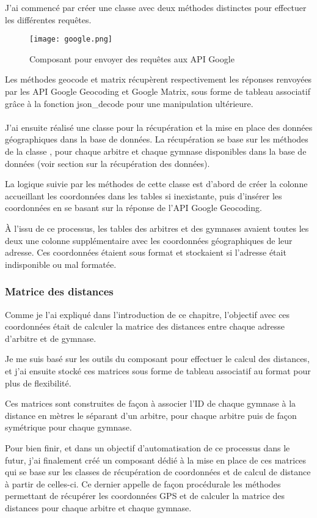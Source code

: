 J’ai commencé par créer une classe avec deux méthodes distinctes pour effectuer les différentes requêtes.

\begin{figure}[!h]
    \centering
    \texttt{[image: google.png]}
    \caption{Composant pour envoyer des requêtes aux API Google}
\end{figure}

Les méthodes geocode et matrix récupèrent respectivement les réponses renvoyées par les API Google Geocoding et Google Matrix, sous forme de tableau associatif grâce à la fonction json\_decode pour une manipulation ultérieure.\\ \\

J’ai ensuite réalisé une classe pour la récupération et la mise en place des données géographiques dans la base de données. La récupération se base sur les méthodes de la classe  , pour chaque arbitre et chaque gymnase disponibles dans la base de données (voir section sur la récupération des données).

La logique suivie par les méthodes de cette classe est d’abord de créer la colonne accueillant les coordonnées dans les tables si inexistante, puis d’insérer les coordonnées en se basant sur la réponse de l’API Google Geocoding.

À l’issu de ce processus, les tables des arbitres et des gymnases avaient toutes les deux une colonne supplémentaire avec les coordonnées géographiques de leur adresse. Ces coordonnées étaient sous format  et stockaient  si l’adresse était indisponible ou mal formatée.

\subsubsection{Matrice des distances}
\vspace{1cm}

Comme je l’ai expliqué dans l’introduction de ce chapitre, l’objectif avec ces coordonnées était de calculer la matrice des distances entre chaque adresse d’arbitre et de gymnase. 

Je me suis basé sur les outils du composant  pour effectuer le calcul des distances, et j’ai ensuite stocké ces matrices sous forme de tableau associatif au format  pour plus de flexibilité.

Ces matrices sont construites de façon à associer l’ID de chaque gymnase à la distance en mètres le séparant d’un arbitre, pour chaque arbitre puis de façon symétrique pour chaque gymnase.

Pour bien finir, et dans un objectif d’automatisation de ce processus dans le futur, j’ai finalement créé un composant dédié à la mise en place de ces matrices qui se base sur les classes de récupération de coordonnées et de calcul de distance à partir de celles-ci. 
Ce dernier appelle de façon procédurale les méthodes permettant de récupérer les coordonnées GPS et de calculer la matrice des distances pour chaque arbitre et chaque gymnase.